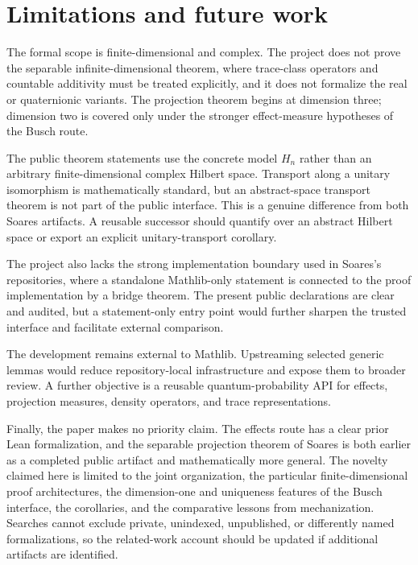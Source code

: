 \documentclass[pdflatex,sn-mathphys-num]{sn-jnl}
\theoremstyle{thmstyleone}
\theoremstyle{thmstylethree}
\begin{document}
\section{Limitations and future work}\label{sec:limitations}

The formal scope is finite-dimensional and complex. The project does not prove the separable infinite-dimensional theorem, where trace-class operators and countable additivity must be treated explicitly, and it does not formalize the real or quaternionic variants. The projection theorem begins at dimension three; dimension two is covered only under the stronger effect-measure hypotheses of the Busch route.

The public theorem statements use the concrete model \(H_n\) rather than an arbitrary finite-dimensional complex Hilbert space. Transport along a unitary isomorphism is mathematically standard, but an abstract-space transport theorem is not part of the public interface. This is a genuine difference from both Soares artifacts. A reusable successor should quantify over an abstract Hilbert space or export an explicit unitary-transport corollary.

The project also lacks the strong implementation boundary used in Soares's repositories, where a standalone Mathlib-only statement is connected to the proof implementation by a bridge theorem. The present public declarations are clear and audited, but a statement-only entry point would further sharpen the trusted interface and facilitate external comparison.

The development remains external to Mathlib. Upstreaming selected generic lemmas would reduce repository-local infrastructure and expose them to broader review. A further objective is a reusable quantum-probability API for effects, projection measures, density operators, and trace representations.

Finally, the paper makes no priority claim. The effects route has a clear prior Lean formalization, and the separable projection theorem of Soares is both earlier as a completed public artifact and mathematically more general. The novelty claimed here is limited to the joint organization, the particular finite-dimensional proof architectures, the dimension-one and uniqueness features of the Busch interface, the corollaries, and the comparative lessons from mechanization. Searches cannot exclude private, unindexed, unpublished, or differently named formalizations, so the related-work account should be updated if additional artifacts are identified.
\end{document}
